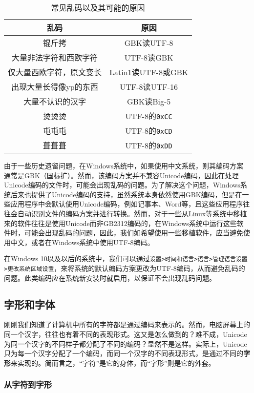 \begin{table}[ht]
  \centering
  \caption{常见乱码以及其可能的原因}
  \begin{tabular}{c|c}
    \toprule
    乱码 & 原因 \\
    \midrule
    锟斤拷 & GBK读UTF-8 \\
    大量非法字符和西欧字符 & UTF-8读GBK \\
    仅大量西欧字符，原文变长 & Latin1读UTF-8或GBK \\
    出现大量长得像yp的东西 & UTF-8读UTF-16 \\
    大量不认识的汉字 & GBK读Big-5 \\
    \midrule
    烫烫烫 & UTF-8的\texttt{0xCC}\\
    屯屯屯 & UTF-8的\texttt{0xCD}\\
    葺葺葺 & UTF-8的\texttt{0xDD}\\
    \bottomrule
  \end{tabular}
\end{table}

由于一些历史遗留问题，在Windows系统中，如果使用中文系统，则其编码方案通常是GBK（国标扩）。然而，该编码方案并不兼容Unicode编码，因此在处理Unicode编码的文件时，可能会出现乱码的问题。为了解决这个问题，Windows系统后来也提供了Unicode编码的支持，虽然系统本身依然使用GBK编码，但是在一些应用程序中会默认使用Unicode编码，例如记事本、Word等，且这些应用程序往往会自动识别文件的编码方案并进行转换。然而，对于一些从Linux等系统中移植来的软件往往是使用Unicode而非GB2312编码的，在Windows系统中运行这些软件时，可能会出现乱码的问题，因此，我们如希望使用一些移植软件，应当避免使用中文，或者在Windows系统中使用UTF-8编码。

在Windows 10以及以后的系统中，我们可以通过\texttt{设置>时间和语言>语言>管理语言设置>更改系统区域设置}，来将系统的默认编码方案更改为UTF-8编码，从而避免乱码的问题。此类编码应在系统新安装时就启用，以保证不会出现乱码问题。

\subsection{字形和字体}

刚刚我们知道了计算机中所有的字符都是通过编码来表示的。然而，电脑屏幕上的同一个汉字，往往也有着不同的表现形式。这又是怎么做到的？难不成，Unicode为同一个汉字的不同样子都分配了不同的编码？显然不是这样。实际上，Unicode只为每一个汉字分配了一个编码，而同一个汉字的不同表现形式，是通过不同的\textbf{字形}来实现的。简而言之，“字符”是它的身体，而“字形”则是它的外套。

\subsubsection{从字符到字形}

